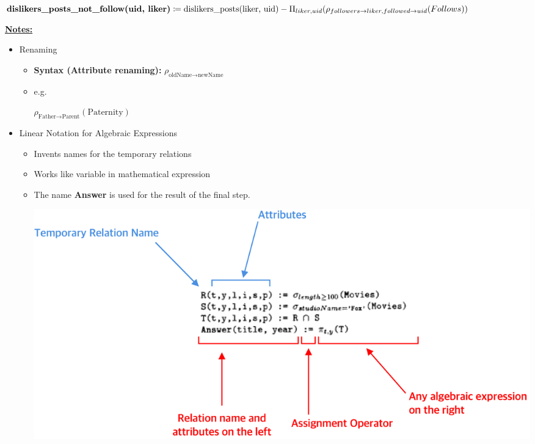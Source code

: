 \documentclass[12pt]{article}
\begin{document}
\begin{enumerate}[1.]
\begin{itemize}
        \begin{mdframed}
        $\textbf{dislikers\_posts\_not\_follow(uid, liker)} \coloneqq \text{dislikers\_posts(liker, uid)} -\\ \Pi_{liker, uid}(\rho_{followers \to liker, followed \to uid}(Follows))$
        \end{mdframed}
    \end{itemize}

    \bigskip

    \underline{\textbf{Notes:}}

    \bigskip

    \begin{itemize}
        \item Renaming
        \begin{itemize}
            \item \textbf{Syntax (Attribute renaming):} $\rho_{\text{oldName} \to \text{newName}}$
            \item e.g.

            \bigskip

            $\rho_{\text{Father} \to \text{Parent}}(\text{Paternity})$
        \end{itemize}
        \item Linear Notation for Algebraic Expressions
        \begin{itemize}
            \item Invents names for the temporary relations
            \item Works like variable in mathematical expression
            \item The name \textbf{Answer} is used for the result of the final step.

            \begin{center}
            \includegraphics[width=\linewidth]{../images/assignment_1_solution_1.png}
            \end{center}
        \end{itemize}


\end{itemize}
\end{enumerate}
\end{document}
